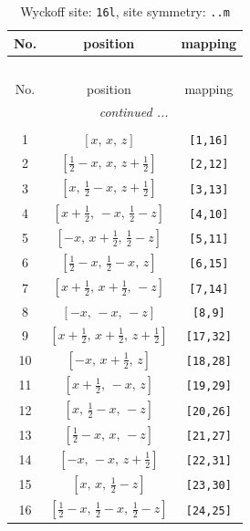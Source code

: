 \documentclass[fleqn,8pt]{jsarticle}
\begin{document}
\renewcommand{\arraystretch}{1.2}
\begin{longtable}{ccc}
\caption{Wyckoff site: {\tt 16l}, site symmetry: {\tt ..m}}
 \\
 \hline \hline
No. & position & mapping \\ \hline \endfirsthead

\multicolumn{2}{l}{\tablename\ \thetable{}} \\
 \hline \hline
No. & position & mapping \\ \hline \endhead

 \hline \hline
\multicolumn{2}{r}{\footnotesize\it continued ...} \\ \endfoot

 \hline \hline
\multicolumn{2}{r}{} \\ \endlastfoot

1 & $\left[ x,\, x,\, z \right]$ & {\tt [1,16]} \\ \hline
2 & $\left[ \frac{1}{2} - x,\, x,\, z + \frac{1}{2} \right]$ & {\tt [2,12]} \\ \hline
3 & $\left[ x,\, \frac{1}{2} - x,\, z + \frac{1}{2} \right]$ & {\tt [3,13]} \\ \hline
4 & $\left[ x + \frac{1}{2},\, - x,\, \frac{1}{2} - z \right]$ & {\tt [4,10]} \\ \hline
5 & $\left[ - x,\, x + \frac{1}{2},\, \frac{1}{2} - z \right]$ & {\tt [5,11]} \\ \hline
6 & $\left[ \frac{1}{2} - x,\, \frac{1}{2} - x,\, z \right]$ & {\tt [6,15]} \\ \hline
7 & $\left[ x + \frac{1}{2},\, x + \frac{1}{2},\, - z \right]$ & {\tt [7,14]} \\ \hline
8 & $\left[ - x,\, - x,\, - z \right]$ & {\tt [8,9]} \\ \hline
9 & $\left[ x + \frac{1}{2},\, x + \frac{1}{2},\, z + \frac{1}{2} \right]$ & {\tt [17,32]} \\ \hline
10 & $\left[ - x,\, x + \frac{1}{2},\, z \right]$ & {\tt [18,28]} \\ \hline
11 & $\left[ x + \frac{1}{2},\, - x,\, z \right]$ & {\tt [19,29]} \\ \hline
12 & $\left[ x,\, \frac{1}{2} - x,\, - z \right]$ & {\tt [20,26]} \\ \hline
13 & $\left[ \frac{1}{2} - x,\, x,\, - z \right]$ & {\tt [21,27]} \\ \hline
14 & $\left[ - x,\, - x,\, z + \frac{1}{2} \right]$ & {\tt [22,31]} \\ \hline
15 & $\left[ x,\, x,\, \frac{1}{2} - z \right]$ & {\tt [23,30]} \\ \hline
16 & $\left[ \frac{1}{2} - x,\, \frac{1}{2} - x,\, \frac{1}{2} - z \right]$ & {\tt [24,25]} \\
\end{longtable}
\end{document}
